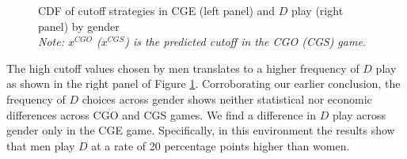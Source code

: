 \documentclass[12pt, letterpaper]{article}
\theoremstyle{plain}
\begin{document}
\begin{center}
\begin{figure}[ht]
\centering{}%
\begin{minipage}[t]{0.45\columnwidth}%
%
\end{minipage}%
\begin{minipage}[t]{0.45\columnwidth}%
%
\end{minipage} 
\caption{CDF of cutoff strategies in CGE (left panel) and $D$ play (right panel) by gender\\ \footnotesize{\textit{Note: $x^{CGO}$ ($x^{CGS}$) is the predicted cutoff in the CGO (CGS) game.}}}
\label{fig:cdfgender2}\end{figure}
\par\end{center}




The high cutoff values chosen by men translates to a higher frequency of $D$ play as shown in the right panel of Figure \ref{fig:cdfgender2}. Corroborating our earlier conclusion, the frequency of $D$ choices across gender shows neither statistical nor economic differences across CGO and CGS games. We find a difference in $D$ play across gender only in the CGE game. Specifically, in this environment the results show that men play $D$ at a rate of 20 percentage points higher than women. 
\end{document}
